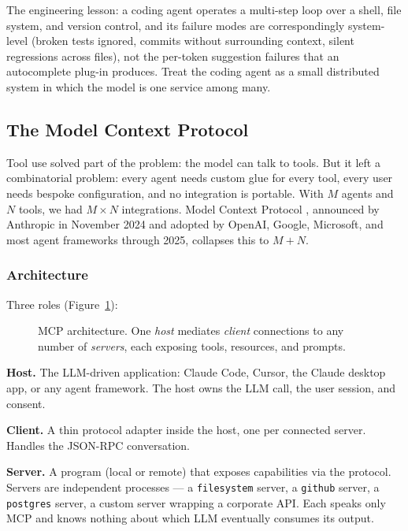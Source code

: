 The engineering lesson: a coding agent operates a multi-step loop
over a shell, file system, and version control, and its failure
modes are correspondingly system-level (broken tests ignored,
commits without surrounding context, silent regressions across
files), not the per-token suggestion failures that an autocomplete
plug-in produces. Treat the coding agent as a small distributed
system in which the model is one service among many.

\subsection{The Model Context Protocol}

Tool use solved part of the problem: the model can talk to tools.
But it left a combinatorial problem: every agent needs custom
glue for every tool, every user needs bespoke configuration, and
no integration is portable. With $M$ agents and $N$ tools, we had
$M \times N$ integrations. Model Context Protocol
\citep{mcp_spec, mcp_intro}, announced by Anthropic in November
2024 and adopted by OpenAI, Google, Microsoft, and most agent
frameworks through 2025, collapses this to $M + N$.

\subsubsection{Architecture}

Three roles (Figure~\ref{fig:mcp}):

\begin{figure}[H]
  \centering
  
  \caption{MCP architecture. One \emph{host} mediates
           \emph{client} connections to any number of
           \emph{servers}, each exposing tools, resources, and
           prompts.}
  \label{fig:mcp}
\end{figure}

\textbf{Host.} The LLM-driven application: Claude Code, Cursor,
the Claude desktop app, or any agent framework. The host owns
the LLM call, the user session, and consent.

\textbf{Client.} A thin protocol adapter inside the host, one
per connected server. Handles the JSON-RPC conversation.

\textbf{Server.} A program (local or remote) that exposes
capabilities via the protocol. Servers are independent processes
--- a \texttt{filesystem} server, a \texttt{github} server, a
\texttt{postgres} server, a custom server wrapping a corporate
API. Each speaks only MCP and knows nothing about which LLM
eventually consumes its output.

